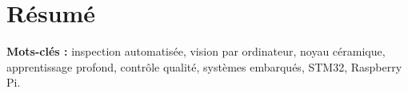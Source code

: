 \chapter*{Résumé}


\vspace{1cm}
\noindent\textbf{Mots-clés :} inspection automatisée, vision par ordinateur, noyau céramique, apprentissage profond, contrôle qualité, systèmes embarqués, STM32, Raspberry Pi.
